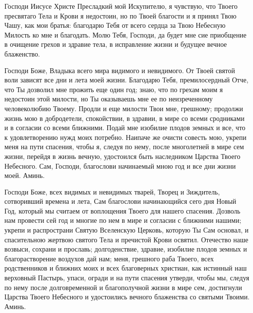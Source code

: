 \mychapterending


\begin{mymulticols}




Господи Иисусе Христе Пресладкий мой Искупителю, я чувствую, что Твоего пресвятаго Тела и Крови я недостоин, но по Твоей благости и я принял Твою Чашу, как мои братья: благодарю Тебя от всего сердца за Твою Небесную Милость ко мне и благодать. Молю Тебя, Господи, да будет мне сие приобщение в очищение грехов и здравие тела, в исправление жизни и будущее вечное блаженство.

\end{mymulticols}

\mychapterending


\begin{mymulticols}




Господи Боже, Владыка всего мира видимого и невидимого. От Твоей святой воли зависят все дни и лета моей жизни. Благодарю Тебя, премилосердный Отче, что Ты дозволил мне прожить еще один год; знаю, что по грехам моим я недостоин этой милости, но Ты оказываешь мне ее по неизреченному человеколюбию Твоему. Продли и еще милости Твои мне, грешному; продолжи жизнь мою в добродетели, спокойствии, в здравии, в мире со всеми сродниками и в согласии со всеми ближними. Подай мне изобилие плодов земных и все, что к удовлетворению нужд моих потребно. Наипаче же очисти совесть мою, укрепи меня на пути спасения, чтобы я, следуя по нему, после многолетней в мире сем жизни, перейдя в жизнь вечную, удостоился быть наследником Царства Твоего Небесного. Сам, Господи, благослови начинаемый мною год и все дни жизни моей. Аминь.

\end{mymulticols}

\mychapterending


\begin{mymulticols}




Господи Боже, всех видимых и невидимых тварей, Творец и Зиждитель, сотворивший времена и лета, Сам благослови начинающийся сего дня Новый Год, который мы считаем от воплощения Твоего для нашего спасения. Дозволь нам провести сей год и многие по нем в мире и согласии с ближними нашими; укрепи и распространи Святую Вселенскую Церковь, которую Ты Сам основал, и спасительною жертвою святого Тела и пречистой Крови освятил. Отечество наше возвыси, сохрани и прославь; долгоденствие, здравие, изобилие плодов земных и благорастворение воздухов дай нам; меня, грешного раба Твоего, всех родственников и ближних моих и всех благоверных христиан, как истинный наш верховный Пастырь, упаси, огради и на пути спасения утверди, чтобы мы, следуя по нему после долговременной и благополучной жизни в мире сем, достигнули Царства Твоего Небесного и удостоились вечного блаженства со святыми Твоими. Аминь.

\end{mymulticols}

